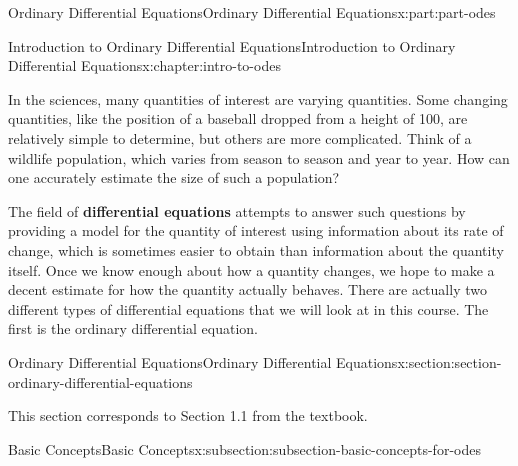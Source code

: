 \documentclass[twoside,10pt,]{book}
\newcommand{\terminology}[1]{\textbf{#1}}
\numberwithin{equation}{part}
\begin{document}
\raggedbottom
%
%
\typeout{************************************************}
\typeout{************************************************}
%
\begin{partptx}{Ordinary Differential Equations}{}{Ordinary Differential Equations}{}{}{x:part:part-odes}
%
\typeout{************************************************}
\typeout{************************************************}
%
\begin{chapterptx}{Introduction to Ordinary Differential Equations}{}{Introduction to Ordinary Differential Equations}{}{}{x:chapter:intro-to-odes}
\begin{introduction}{}%
In the sciences, many quantities of interest are varying quantities. Some changing quantities, like the position of a baseball dropped from a height of \SI{100}{\foot}, are relatively simple to determine, but others are more complicated. Think of a wildlife population, which varies from season to season and year to year. How can one accurately estimate the size of such a population?%
\par
The field of \terminology{differential equations} attempts to answer such questions by providing a model for the quantity of interest using information about its rate of change, which is sometimes easier to obtain than information about the quantity itself. Once we know enough about how a quantity changes, we hope to make a decent estimate for how the quantity actually behaves. There are actually two different types of differential equations that we will look at in this course. The first is the ordinary differential equation.%
\end{introduction}%
%
%
\typeout{************************************************}
\typeout{************************************************}
%
\begin{sectionptx}{Ordinary Differential Equations}{}{Ordinary Differential Equations}{}{}{x:section:section-ordinary-differential-equations}
\begin{introduction}{}%
This section corresponds to Section 1.1 from the textbook.%
\end{introduction}%
%
%
\typeout{************************************************}
\typeout{************************************************}
%
\begin{subsectionptx}{Basic Concepts}{}{Basic Concepts}{}{}{x:subsection:subsection-basic-concepts-for-odes}

\end{subsectionptx}
\end{sectionptx}
\end{chapterptx}
\end{partptx}
\end{document}
